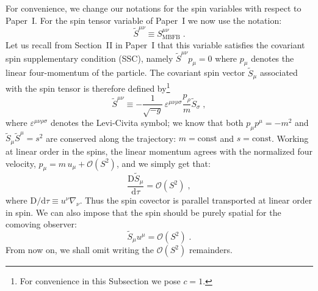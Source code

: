 \documentclass[
superscriptaddress,
preprint,
prd,tightenlines,showpacs,nofootinbib,
eqsecnum,
amsfonts,amsmath,amssymb]{revtex4-1}
\newcommand{\ud}{\mathrm{d}}
\newcommand{\uD}{\mathrm{D}}
\newcommand{\calO}{\mathcal{O}}
\begin{document}
For convenience, we change our notations for the spin variables with
respect to Paper~I. For the spin tensor variable of Paper~I we now use
the notation:
%
\begin{equation}
	\tilde{S}^{\mu\nu} \equiv S^{\mu\nu}_\text{MBFB} \;.
\end{equation}
%
Let us recall from Section~II in Paper~I that this variable satisfies
the covariant spin supplementary condition (SSC), namely
$\tilde{S}^{\mu\nu}p_{\mu}=0$ where $p_\mu$ denotes the linear
four-momentum of the particle. The covariant spin vector
$\tilde{S}_{\mu}$ associated with the spin tensor is therefore defined
by\footnote{For convenience in this Subsection we pose $c=1$.}
%
\begin{equation}\label{eq:DefSmu}
  \tilde{S}^{\mu\nu} \equiv -\frac{1}{\sqrt{-g}} \,
  \varepsilon^{\mu\nu\rho\sigma}\frac{p_{\rho}}{m}
  \tilde{S}_{\sigma} \;,
\end{equation}
%
where $\varepsilon^{\mu\nu\rho\sigma}$ denotes the Levi-Civita symbol;
we know that both $p_\mu p^\mu = - m^2$ and
$\tilde{S}_{\mu}\tilde{S}^{\mu} = s^{2}$ are conserved along the
trajectory: $m = \mathrm{const}$ and $s = \mathrm{const}$. Working at
linear order in the spins, the linear momentum agrees with the
normalized four velocity, $p_\mu = m \,u_\mu + \calO(S^{2})$, and we
simply get that:
%
\begin{equation}\label{parallel}
  \frac{\uD\tilde{S}_{\mu}}{\ud\tau} = \calO(S^{2}) \; ,
\end{equation}
%
where $\uD/\ud\tau \equiv u^{\nu}\nabla_{\nu}$. Thus the spin covector
is parallel transported at linear order in spin. We can also impose
that the spin should be purely spatial for the comoving observer:
%
\begin{equation}%
	\tilde{S}_{\mu}u^{\mu} = \calO(S^{2})\; .
\end{equation}
%
From now on, we shall omit writing the $\calO(S^{2})$ remainders.
\end{document}
